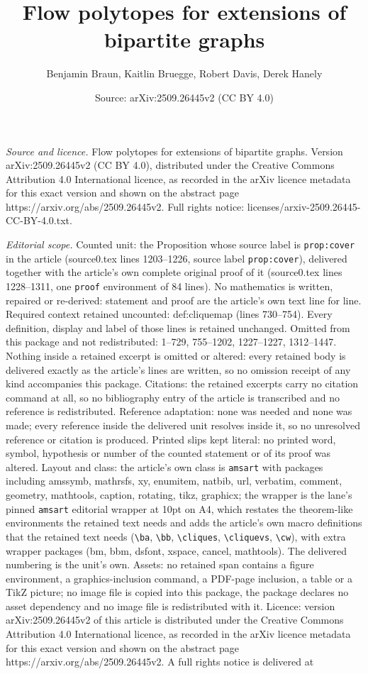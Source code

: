 \documentclass[10pt,a4paper]{amsart}
\title[Flow polytopes for extensions of bipartite graphs]{Flow polytopes for extensions of bipartite graphs}
\author{Benjamin Braun, Kaitlin Bruegge, Robert Davis, Derek Hanely}
\date{Source: arXiv:2509.26445v2 (CC BY 4.0)}
\begin{document}
\maketitle

\noindent\emph{Source and licence.} Flow polytopes for extensions of bipartite graphs. Version arXiv:2509.26445v2 (CC BY 4.0), distributed under the Creative Commons Attribution 4.0 International licence, as recorded in the arXiv licence metadata for this exact version and shown on the abstract page https://arxiv.org/abs/2509.26445v2. Full rights notice: licenses/arxiv-2509.26445-CC-BY-4.0.txt.\par\smallskip

\noindent\textit{Editorial scope.} Counted unit: the Proposition whose source label is \texttt{prop:cover} in the article (source0.tex lines 1203--1226, source label \texttt{prop:cover}), delivered together with the article's own complete original proof of it (source0.tex lines 1228--1311, one \texttt{proof} environment of 84 lines). No mathematics is written, repaired or re-derived: statement and proof are the article's own text line for line. Required context retained uncounted: def:cliquemap (lines 730--754). Every definition, display and label of those lines is retained unchanged. Omitted from this package and not redistributed: 1--729, 755--1202, 1227--1227, 1312--1447. Nothing inside a retained excerpt is omitted or altered: every retained body is delivered exactly as the article's lines are written, so no omission receipt of any kind accompanies this package. Citations: the retained excerpts carry no citation command at all, so no bibliography entry of the article is transcribed and no reference is redistributed. Reference adaptation: none was needed and none was made; every reference inside the delivered unit resolves inside it, so no unresolved reference or citation is produced. Printed slips kept literal: no printed word, symbol, hypothesis or number of the counted statement or of its proof was altered. Layout and class: the article's own class is \texttt{amsart} with packages including amssymb, mathrsfs, xy, enumitem, natbib, url, verbatim, comment, geometry, mathtools, caption, rotating, tikz, graphicx; the wrapper is the lane's pinned \texttt{amsart} editorial wrapper at 10pt on A4, which restates the theorem-like environments the retained text needs and adds the article's own macro definitions that the retained text needs (\texttt{\textbackslash ba}, \texttt{\textbackslash bb}, \texttt{\textbackslash cliques}, \texttt{\textbackslash cliquevs}, \texttt{\textbackslash cw}), with extra wrapper packages (bm, bbm, dsfont, xspace, cancel, mathtools). The delivered numbering is the unit's own. Assets: no retained span contains a figure environment, a graphics-inclusion command, a PDF-page inclusion, a table or a TikZ picture; no image file is copied into this package, the package declares no asset dependency and no image file is redistributed with it. Licence: version arXiv:2509.26445v2 of this article is distributed under the Creative Commons Attribution 4.0 International licence, as recorded in the arXiv licence metadata for this exact version and shown on the abstract page https://arxiv.org/abs/2509.26445v2. A full rights notice is delivered at 
\end{document}
